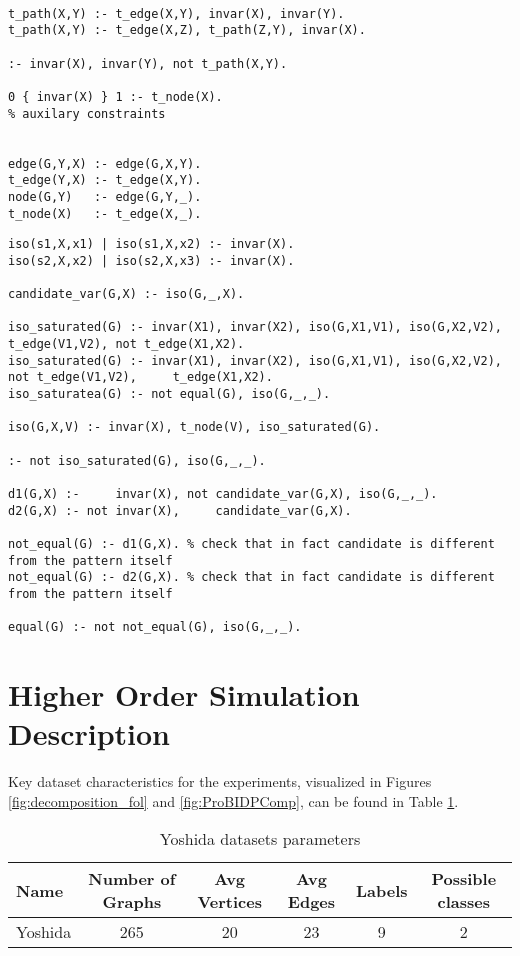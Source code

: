 \begin{lstlisting}[caption=ASP auxilary predicates, style=model]
%selects subpattern

t_path(X,Y) :- t_edge(X,Y), invar(X), invar(Y).
t_path(X,Y) :- t_edge(X,Z), t_path(Z,Y), invar(X).

:- invar(X), invar(Y), not t_path(X,Y).

0 { invar(X) } 1 :- t_node(X).
% auxilary constraints


edge(G,Y,X) :- edge(G,X,Y).
t_edge(Y,X) :- t_edge(X,Y).
node(G,Y)   :- edge(G,Y,_).
t_node(X)   :- t_edge(X,_).
\end{lstlisting}

\begin{lstlisting}[caption=ASP canonicity previous solution isomorphism check, style=model]
iso(s1,X,x1) | iso(s1,X,x2) :- invar(X).
iso(s2,X,x2) | iso(s2,X,x3) :- invar(X).

candidate_var(G,X) :- iso(G,_,X).

iso_saturated(G) :- invar(X1), invar(X2), iso(G,X1,V1), iso(G,X2,V2),     t_edge(V1,V2), not t_edge(X1,X2). 
iso_saturated(G) :- invar(X1), invar(X2), iso(G,X1,V1), iso(G,X2,V2), not t_edge(V1,V2),     t_edge(X1,X2). 
iso_saturatea(G) :- not equal(G), iso(G,_,_). 

iso(G,X,V) :- invar(X), t_node(V), iso_saturated(G).

:- not iso_saturated(G), iso(G,_,_).

d1(G,X) :-     invar(X), not candidate_var(G,X), iso(G,_,_).
d2(G,X) :- not invar(X),     candidate_var(G,X).

not_equal(G) :- d1(G,X). % check that in fact candidate is different from the pattern itself
not_equal(G) :- d2(G,X). % check that in fact candidate is different from the pattern itself

equal(G) :- not not_equal(G), iso(G,_,_).

\end{lstlisting}

\section{Higher Order Simulation Description}
\label{sec:hol_description}
Key dataset characteristics for the experiments, visualized in Figures \ref{fig:decomposition_fol} and \ref{fig:ProBIDPComp}, can be found in Table \ref{table:yoshida}.
\begin{table}[thb]
  \caption{Yoshida datasets parameters}
  \label{table:yoshida}
  \begin{tabular}{l c c c c c}
    Name & Number of Graphs & Avg Vertices & Avg Edges & Labels & Possible classes\\
    \hline
    Yoshida & 265 & 20 &  23 &  9 & 2
  \end{tabular}
\end{table}

